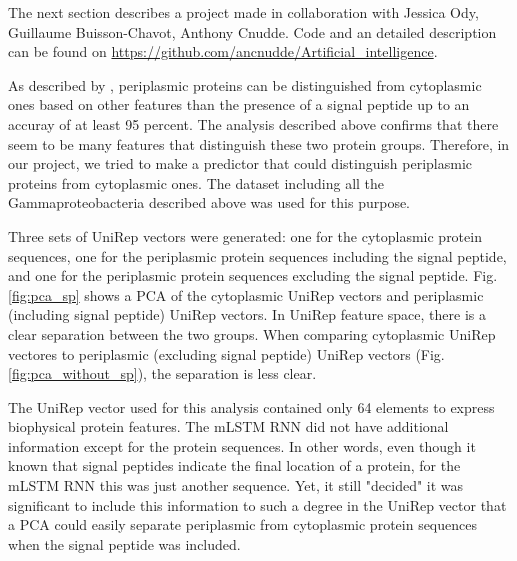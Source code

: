 The next section describes a project made in collaboration with
Jessica Ody, 
Guillaume Buisson-Chavot, 
Anthony Cnudde.
Code and an detailed description can be found on \url{https://github.com/ancnudde/Artificial_intelligence}.

As described by \cite{loos2019},
periplasmic proteins can be distinguished from cytoplasmic ones based on other features than the presence of a signal peptide up to an accuray of at least 95 percent.
The analysis described above confirms that there seem to be many features that distinguish these two protein groups.
Therefore, in our project, we tried to make a predictor that could distinguish periplasmic proteins from cytoplasmic ones.
The dataset including all the Gammaproteobacteria described above was used for this purpose.

Three sets of UniRep vectors were generated:
one for the cytoplasmic protein sequences,
one for the periplasmic protein sequences including the signal peptide,
and one for the periplasmic protein sequences excluding the signal peptide. 
Fig. \ref{fig:pca_sp} shows a PCA of the cytoplasmic UniRep vectors and periplasmic (including signal peptide) UniRep vectors.
In UniRep feature space,
there is a clear separation between the two groups.
When comparing cytoplasmic UniRep vectores to periplasmic (excluding signal peptide) UniRep vectors (Fig. \ref{fig:pca_without_sp}),
the separation is less clear.

The UniRep vector used for this analysis contained only 64 elements to express biophysical protein features.
The mLSTM RNN did not have additional information except for the protein sequences.
In other words, even though it known that signal peptides indicate the final location of a protein,
for the mLSTM RNN this was just another sequence.
Yet, it still "decided" it was significant to include this information to such a degree in the UniRep vector that a PCA could easily separate periplasmic from cytoplasmic protein sequences when the signal peptide was included.


